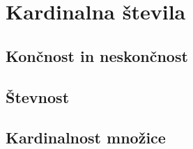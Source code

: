 \chapter{Kardinalna števila}

\section{Končnost in neskončnost}
\section{Števnost}
\section{Kardinalnost množice}

